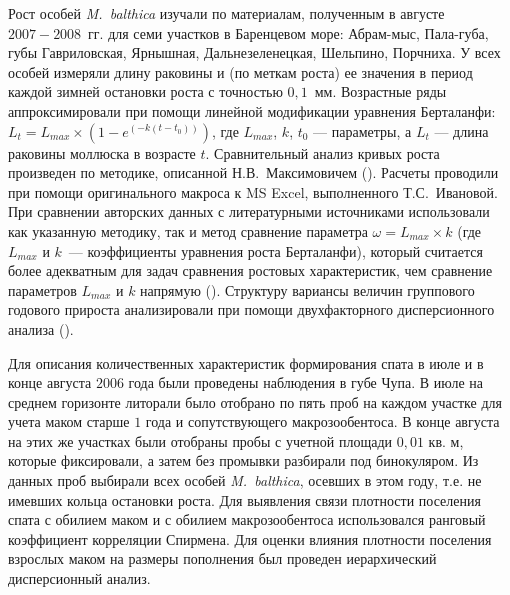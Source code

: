 Рост особей \textit{M.~balthica} изучали по материалам, полученным в августе $2007 - 2008$~гг. для семи участков в Баренцевом море: Абрам-мыс, Пала-губа, губы Гавриловская, Ярнышная, Дальнезеленецкая, Шельпино, Порчниха.
У всех особей измеряли длину раковины и (по меткам роста) ее значения в период каждой зимней остановки роста с точностью $0,1$~мм.
Возрастные ряды аппроксимировали при помощи линейной модификации уравнения Берталанфи: $L_{t} = L_{max} \times (1 - e^{(-k(t - t_{0}))})$, где $L_{max}$, $k$, $t_{0}$ --- параметры, а $L_{t}$ --- длина раковины моллюска в возрасте $t$.
Сравнительный анализ кривых роста произведен по методике, описанной Н.В.~Максимовичем (\cite*{Maximovich_1989}). 
Расчеты проводили при помощи оригинального макроса к MS Excel, выполненного Т.С.~Ивановой.
При сравнении авторских данных с литературными источниками использовали как указанную методику, так и метод сравнение параметра $\omega = L_{max} \times k$ (где $L_{max}$ и $k$~--- коэффициенты уравнения роста Берталанфи), который считается более адекватным для задач сравнения ростовых характеристик, чем сравнение параметров $L_{max}$ и $k$ напрямую (\cite{Appeldoorn_1983, Beukema_Meehan_1985}). 
Структуру вариансы величин группового годового прироста анализировали при помощи двухфакторного дисперсионного анализа (\cite{Chambers_Hastie_1991}). 

Для описания количественных характеристик формирования спата в июле и в конце августа $2006$ года были проведены наблюдения в губе Чупа.
В июле на среднем горизонте литорали было отобрано по пять проб на каждом участке для учета маком старше $1$ года и сопутствующего макрозообентоса. 
В конце августа на этих же участках были отобраны пробы с учетной площади $0,01$ кв. м, которые фиксировали, а затем без промывки разбирали под бинокуляром.  
Из данных проб выбирали всех особей \textit{M.~balthica}, осевших в этом году, т.е. не имевших кольца остановки роста. 
Для выявления связи плотности поселения спата с обилием маком и с обилием макрозообентоса использовался ранговый коэффициент корреляции Спирмена.
Для оценки влияния плотности поселения взрослых маком на размеры пополнения был проведен иерархический дисперсионный анализ.

